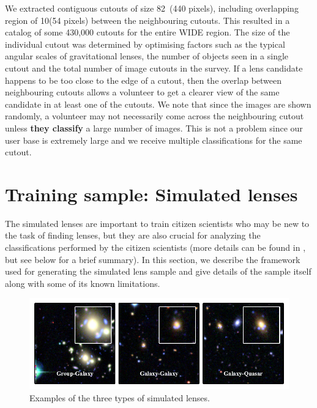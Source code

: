 \documentclass[useAMS,usenatbib,a4paper]{mn2e}
\begin{document}
We extracted contiguous cutouts of size 82\arcsec\ (440 pixels), including
overlapping region of 10\arcsec (54 pixels) between the neighbouring
cutouts. This resulted in a catalog of some 430,000 cutouts for the entire \cfhtls
WIDE region. The size of the individual cutout was determined by
optimising factors such as the typical angular scales of gravitational
lenses, the number of objects seen in a single cutout and the total
number of image cutouts in the survey. If a lens
candidate happens to be too close to the edge of a cutout, then the overlap
between neighbouring cutouts allows a volunteer to get a clearer view
of the same candidate in at least one of the cutouts. We note that since
the images are shown randomly, a volunteer may not necessarily come
across the neighbouring cutout unless {\bf they classify} a large
number of images. This is not a problem since our user base is extremely
large and we receive multiple classifications for the same cutout.



\section{Training sample: Simulated lenses}
\label{sec:ts}

The simulated lenses are important to train citizen scientists who may be
new to the task of finding lenses, but they are also crucial for
analyzing the classifications performed by the citizen scientists (more
details can be found in \PaperOne, but see  below for a brief
summary). In this section, we describe the framework used for generating the
simulated lens sample and give details of the sample itself along with
some of its known limitations.

\begin{figure}
\begin{center}
\includegraphics[scale=1.0]{sim_cgq.pdf}
\caption{ \label{fig:sim}
Examples of the three types of simulated lenses.
}
\end{center}
\end{figure}
\end{document}
